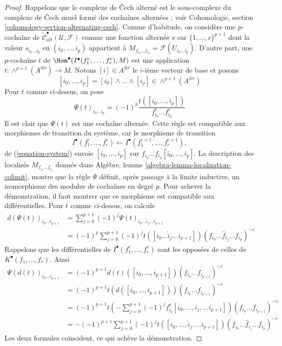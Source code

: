 \begin{proof}
Rappelons que le complexe de {\v C}ech alterné est le sous-complexe
du complexe de {\v C}ech usuel formé des cochaînes alternées ; voir
Cohomologie, section \ref{cohomology-section-alternating-cech}.
Comme d'habitude, on considère une $p$-cochaîne de
$\check{\mathcal{C}}_{alt}^\bullet(\mathcal{U}, \mathcal{F})$
comme une fonction alternée $s$ sur $\{1, \ldots, r\}^{p + 1}$
dont la valeur $s_{i_0\ldots i_p}$ en $(i_0, \ldots, i_p)$ appartient à
$M_{f_{i_0}\ldots f_{i_p}} = \mathcal{F}(U_{i_0\ldots i_p})$.
D'autre part, une $p$-cochaîne $t$ de
$\Hom^\bullet(I^\bullet(f_1^e, \ldots, f_r^e), M)$
est une application $t : \wedge^{p + 1}(A^{\oplus r}) \to M$.
Notons $[i] \in A^{\oplus r}$ le $i$-ième vecteur de base et
posons
$$
[i_0, \ldots, i_p] = [i_0] \wedge \ldots \wedge [i_p]
\in \wedge^{p + 1}(A^{\oplus r})
$$
Pour $t$ comme ci-dessus, on pose
$$
\Psi(t)_{i_0 \ldots i_p} =
(-1)^p \frac{t([i_0, \ldots, i_p])}{f_{i_0}^e\ldots f_{i_p}^e}
$$
Il est clair que $\Psi(t)$ est une cochaîne alternée.
Cette règle est compatible aux morphismes de transition
du système, car le morphisme de transition
$$
I^\bullet(f_1^e, \ldots, f_r^e) \leftarrow
I^\bullet(f_1^{e + 1}, \ldots, f_r^{e + 1}),
$$
de (\ref{equation-system}) envoie $[i_0, \ldots, i_p]$
sur $f_{i_0}\ldots f_{i_p}[i_0, \ldots, i_p]$.
La description des localisés
$M_{f_{i_0} \ldots f_{i_p}}$ donnée dans
Algèbre, lemme \ref{algebra-lemma-localization-colimit},
montre que la règle $\Psi$ définit, après passage à la limite inductive, un isomorphisme des modules de cochaînes
en degré $p$. Pour achever la démonstration, il faut montrer que ce morphisme
est compatible aux différentielles. Pour $t$ comme ci-dessus, on calcule
\begin{align*}
d(\Psi(t))_{i_0 \ldots i_{p + 1}}
& =
\sum\nolimits_{j = 0}^{p + 1} (-1)^j
\Psi(t)_{i_0\ldots \hat i_j \ldots i_{p + 1}} \\
& =
(-1)^p
\sum\nolimits_{j = 0}^{p + 1} (-1)^j t([i_0 \ldots \hat i_j \ldots i_{p + 1}])
(f_{i_0} \ldots \hat f_{i_j} \ldots f_{i_p})^{-e}
\end{align*}
Rappelons que les différentielles de $I^\bullet(f_1^e, \ldots, f_r^e)$
sont les opposées de celles de $K^\bullet(f_1, \ldots, f_r)$.
Ainsi
\begin{align*}
\Psi(d(t))_{i_0 \ldots i_{p + 1}} & =
(-1)^{p + 1}
d(t)([i_0, \ldots, i_{p + 1}]) (f_{i_0} \ldots f_{i_{p + 1}})^{-e} \\
& =
(-1)^{p + 1}
t(d([i_0, \ldots, i_{p + 1}])) (f_{i_0} \ldots f_{i_{p + 1}})^{-e} \\
& =
(-1)^{p + 1}
t(-\sum\nolimits_{j = 0}^{p + 1}
(-1)^j f_{i_j}^e [i_0, \ldots, \hat i_j, \ldots i_{p + 1}])
(f_{i_0} \ldots f_{i_{p + 1}})^{-e} \\
& =
-(-1)^{p + 1}
\sum\nolimits_{j = 0}^{p + 1}
(-1)^j t([i_0, \ldots, \hat i_j, \ldots i_{p + 1}])
(f_{i_0} \ldots \hat f_{i_j} \ldots f_{i_p})^{-e}
\end{align*}
Les deux formules coïncident, ce qui achève la démonstration.
\end{proof}

